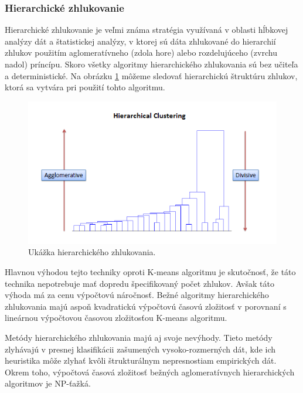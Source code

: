 \subsubsection{Hierarchické zhlukovanie}
Hierarchické zhlukovanie je veľmi známa stratégia využívaná v oblasti hĺbkovej analýzy dát a štatistickej analýzy, v ktorej sú dáta zhlukované do hierarchií zhlukov použitím aglomeratívneho (zdola hore) alebo rozdelujúceho (zvrchu nadol) príncípu. Skoro všetky algoritmy hierarchického zhlukovania sú bez učiteľa a deterministické. Na obrázku \ref{img:hierarch} môžeme sledovať hierarchickú štruktúru zhlukov, ktorá sa vytvára pri použití tohto algoritmu. \par
\begin{figure}[H]
	\begin{center}
		\includegraphics[scale=0.6]{img/hierarchical.png}
		\caption{Ukážka hierarchického zhlukovania.}
		\label{img:hierarch}
	\end{center}
\end{figure}
Hlavnou výhodou tejto techniky oproti K-means algoritmu je skutočnosť, že táto technika nepotrebuje mať dopredu špecifikovaný počet zhlukov. Avšak táto výhoda má za cenu výpočtovú náročnosť. Bežné algoritmy hierarchického zhlukovania majú aspoň kvadratickú výpočtovú časovú zložitosť v porovnaní s lineárnou výpočtovou časovou zložitosťou K-means algoritmu.\par
Metódy hierarchického zhlukovania majú aj svoje nevýhody. Tieto metódy zlyhávajú v presnej klasifikácii zašumených vysoko-rozmerných dát, kde ich heuristika môže zlyhať kvôli štrukturálnym nepresnostiam empirických dát. Okrem toho, výpočtová časová zložitosť bežných aglomeratívnych hierarchických algoritmov je NP-ťažká.
